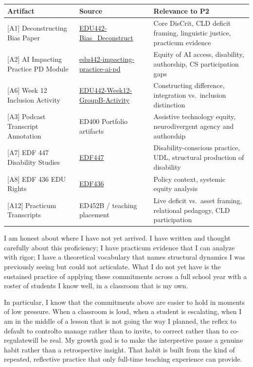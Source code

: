 \documentclass[12pt]{article}
\begin{document}
\begin{longtable}{@{}p{} p{} p{}@{}}
\textbf{Artifact} & \textbf{Source} & \textbf{Relevance to P2} \\
\hline
\endhead
{[A1] Deconstructing Bias Paper} &
\href{https://github.com/pzg8794/EDU442-Bias_Deconstruct-Assignment}{EDU442-Bias\_Deconstruct} &
Core DisCrit, CLD deficit framing, linguistic justice, practicum evidence \\
{[A2] AI Impacting Practice PD Module} &
\href{https://github.com/pzg8794/edu442-impacting-practice-ai-pd}{edu442-impacting-practice-ai-pd} &
Equity of AI access, disability, authorship, CS participation gaps \\
{[A6] Week 12 Inclusion Activity} &
\href{https://github.com/pzg8794/EDU442-Week12-GroupB-Activity}{EDU442-Week12-GroupB-Activity} &
Constructing difference, integration vs.\ inclusion distinction \\
{[A3] Podcast Transcript Annotation} &
ED400 Portfolio artifacts &
Assistive technology equity, neurodivergent agency and authorship \\
{[A7] EDF 447 Disability Studies} &
\href{https://github.com/pzg8794/EDF447}{EDF447} &
Disability-conscious practice, UDL, structural production of disability \\
{[A8] EDF 436 EDU Rights} &
\href{https://github.com/pzg8794/EDF436}{EDF436} &
Policy context, systemic equity analysis \\
{[A12] Practicum Transcripts} &
ED452B / teaching placement &
Live deficit vs.\ asset framing, relational pedagogy, CLD participation \\
\end{longtable}

\newpage

I am honest about where I have not yet arrived. I have written and thought carefully about this proficiency; I have practicum evidence that I can analyze with rigor; I have a theoretical vocabulary that names structural dynamics I was previously seeing but could not articulate. What I do not yet have is the sustained practice of applying these commitments across a full school year with a roster of students I know well, in a classroom that is my own.

In particular, I know that the commitments above are easier to hold in moments of low pressure. When a classroom is loud, when a student is escalating, when I am in the middle of a lesson that is not going the way I planned, the reflex to default to control\textemdash{}to manage rather than to invite, to correct rather than to co-regulate\textemdash{}will be real. My growth goal is to make the interpretive pause a genuine habit rather than a retrospective insight. That habit is built from the kind of repeated, reflective practice that only full-time teaching experience can provide.
\end{document}

